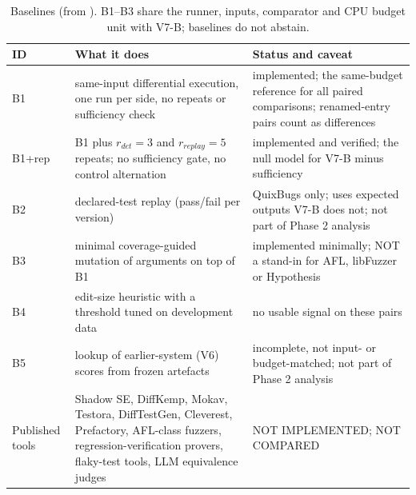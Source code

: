 \begin{table}[t]
\centering\scriptsize
\caption{Baselines (from ). B1--B3 share the runner, inputs, comparator and CPU budget unit with V7-B; baselines do not abstain.}
\label{tab:baselines}
\begin{tabular}{p{}p{}p{}}
\hline
ID & What it does & Status and caveat \\
\hline
B1 & same-input differential execution, one run per side, no repeats or sufficiency check & implemented; the same-budget reference for all paired comparisons; renamed-entry pairs count as differences \\
B1+rep & B1 plus $r_{det}=3$ and $r_{replay}=5$ repeats; no sufficiency gate, no control alternation & implemented and verified; the null model for V7-B minus sufficiency \\
B2 & declared-test replay (pass/fail per version) & QuixBugs only; uses expected outputs V7-B does not; not part of Phase 2 analysis \\
B3 & minimal coverage-guided mutation of arguments on top of B1 & implemented minimally; NOT a stand-in for AFL, libFuzzer or Hypothesis \\
B4 & edit-size heuristic with a threshold tuned on development data & no usable signal on these pairs \\
B5 & lookup of earlier-system (V6) scores from frozen artefacts & incomplete, not input- or budget-matched; not part of Phase 2 analysis \\
Published tools & Shadow SE, DiffKemp, Mokav, Testora, DiffTestGen, Cleverest, Prefactory, AFL-class fuzzers, regression-verification provers, flaky-test tools, LLM equivalence judges & NOT IMPLEMENTED; NOT COMPARED \\
\hline
\end{tabular}
\end{table}
